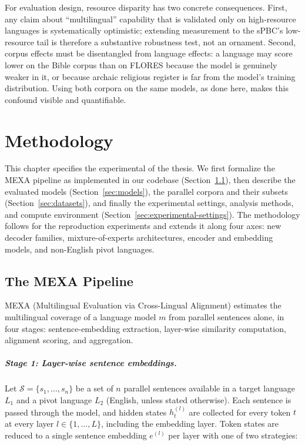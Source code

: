 For evaluation design, resource disparity has two concrete consequences.
First, any claim about ``multilingual'' capability that is validated only
on high-resource languages is systematically optimistic; extending
measurement to the sPBC's low-resource tail is therefore a substantive
robustness test, not an ornament. Second, corpus effects must be
disentangled from language effects: a language may score lower on the
Bible corpus than on FLORES because the model is genuinely weaker in it,
or because archaic religious register is far from the model's training
distribution. Using both corpora on the same models, as done here, makes
this confound visible and quantifiable.


\chapter{Methodology}
\label{ch:methodology}

This chapter specifies the experimental  of the thesis. We first
formalize the MEXA pipeline as implemented in our codebase
(Section~\ref{sec:mexa-pipeline}), then describe the evaluated models
(Section~\ref{sec:models}), the parallel corpora and their subsets
(Section~\ref{sec:datasets}), and finally the experimental settings,
analysis methods, and compute environment
(Section~\ref{sec:experimental-settings}). The methodology follows
\citet{kargaran2025mexa} for the reproduction experiments and extends it
along four axes: new decoder families, mixture-of-experts architectures,
encoder and embedding models, and non-English pivot languages.

\section{The MEXA Pipeline}
\label{sec:mexa-pipeline}

MEXA (Multilingual Evaluation via Cross-Lingual Alignment) estimates the
multilingual coverage of a language model $m$ from parallel sentences
alone, in four stages: sentence-embedding extraction, layer-wise
similarity computation, alignment scoring, and aggregation.

\paragraph{Stage 1: Layer-wise sentence embeddings.}
Let $\mathcal{S} = \{s_1, \dots, s_n\}$ be a set of $n$ parallel sentences
available in a target language $L_1$ and a pivot language $L_2$ (English,
unless stated otherwise). Each sentence is passed through the model, and
hidden states $h_t^{(l)}$ are collected for every token $t$ at every layer
$l \in \{1, \dots, L\}$, including the embedding layer. Token states are
reduced to a single sentence embedding $e^{(l)}$ per layer with one of two
strategies:

